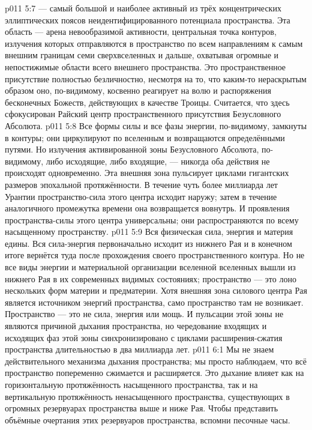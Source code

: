 \vs p011 5:7 \pc {} --- самый большой и наиболее активный из трёх концентрических эллиптических поясов неидентифицированного потенциала пространства. Эта область --- арена невообразимой активности, центральная точка контуров, излучения которых отправляются в пространство по всем направлениям к самым внешним границам семи сверхвселенных и дальше, охватывая огромные и непостижимые области всего внешнего пространства. Это пространственное присутствие полностью безличностно, несмотря на то, что каким\hyp{}то нераскрытым образом оно, по\hyp{}видимому, косвенно реагирует на волю и распоряжения бесконечных Божеств, действующих в качестве Троицы. Считается, что здесь сфокусирован Райский центр пространственного присутствия Безусловного Абсолюта.
\vs p011 5:8 Все формы силы и все фазы энергии, по\hyp{}видимому, замкнуты в контуры; они циркулируют по вселенным и возвращаются определёнными путями. Но излучения активированной зоны Безусловного Абсолюта, по\hyp{}видимому, либо исходящие, либо входящие, --- никогда оба действия не происходят одновременно. Эта внешняя зона пульсирует циклами гигантских размеров эпохальной протяжённости. В течение чуть более миллиарда лет Урантии пространство\hyp{}сила этого центра исходит наружу; затем в течение аналогичного промежутка времени она возвращается вовнутрь. И проявления пространства\hyp{}силы этого центра универсальны; они распространяются по всему насыщенному пространству.
\vs p011 5:9 \pc Вся физическая сила, энергия и материя едины. Вся сила\hyp{}энергия первоначально исходит из нижнего Рая и в конечном итоге вернётся туда после прохождения своего пространственного контура. Но не все виды энергии и материальной организации вселенной вселенных вышли из нижнего Рая в их современных видимых состояниях; пространство --- это лоно нескольких форм материи и предматерии. Хотя внешняя зона силового центра Рая является источником энергий пространства, само пространство там не возникает. Пространство --- это не сила, энергия или мощь. И пульсации этой зоны не являются причиной дыхания пространства, но чередование входящих и исходящих фаз этой зоны синхронизировано с циклами расширения\hyp{}сжатия пространства длительностью в два миллиарда лет.
\vs p011 6:1 Мы не знаем действительного механизма дыхания пространства; мы просто наблюдаем, что всё пространство попеременно сжимается и расширяется. Это дыхание влияет как на горизонтальную протяжённость насыщенного пространства, так и на вертикальную протяжённость ненасыщенного пространства, существующих в огромных резервуарах пространства выше и ниже Рая. Чтобы представить объёмные очертания этих резервуаров пространства, вспомни песочные часы.
